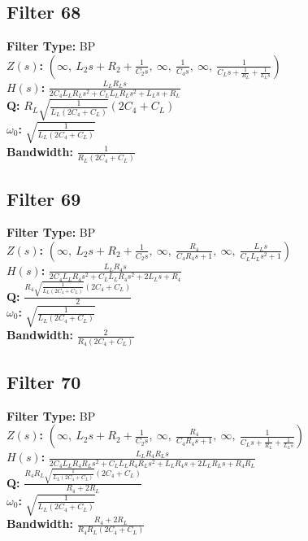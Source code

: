 \documentclass{article}
\begin{document}
\subsection*{Filter 68}
\textbf{Filter Type:} BP \\ 
\textbf{$Z(s)$:} $\left( \infty, \  L_{2} s + R_{2} + \frac{1}{C_{2} s}, \  \infty, \  \frac{1}{C_{4} s}, \  \infty, \  \frac{1}{C_{L} s + \frac{1}{R_{L}} + \frac{1}{L_{L} s}}\right)$ \\ 
\textbf{$H(s)$:} $\frac{L_{L} R_{L} s}{2 C_{4} L_{L} R_{L} s^{2} + C_{L} L_{L} R_{L} s^{2} + L_{L} s + R_{L}}$ \\ 
\textbf{Q:} $R_{L} \sqrt{\frac{1}{L_{L} \left(2 C_{4} + C_{L}\right)}} \left(2 C_{4} + C_{L}\right)$ \\ 
\textbf{$\omega_0$:} $\sqrt{\frac{1}{L_{L} \left(2 C_{4} + C_{L}\right)}}$ \\ 
\textbf{Bandwidth:} $\frac{1}{R_{L} \left(2 C_{4} + C_{L}\right)}$ \\ 
\subsection*{Filter 69}
\textbf{Filter Type:} BP \\ 
\textbf{$Z(s)$:} $\left( \infty, \  L_{2} s + R_{2} + \frac{1}{C_{2} s}, \  \infty, \  \frac{R_{4}}{C_{4} R_{4} s + 1}, \  \infty, \  \frac{L_{L} s}{C_{L} L_{L} s^{2} + 1}\right)$ \\ 
\textbf{$H(s)$:} $\frac{L_{L} R_{4} s}{2 C_{4} L_{L} R_{4} s^{2} + C_{L} L_{L} R_{4} s^{2} + 2 L_{L} s + R_{4}}$ \\ 
\textbf{Q:} $\frac{R_{4} \sqrt{\frac{1}{L_{L} \left(2 C_{4} + C_{L}\right)}} \left(2 C_{4} + C_{L}\right)}{2}$ \\ 
\textbf{$\omega_0$:} $\sqrt{\frac{1}{L_{L} \left(2 C_{4} + C_{L}\right)}}$ \\ 
\textbf{Bandwidth:} $\frac{2}{R_{4} \left(2 C_{4} + C_{L}\right)}$ \\ 
\subsection*{Filter 70}
\textbf{Filter Type:} BP \\ 
\textbf{$Z(s)$:} $\left( \infty, \  L_{2} s + R_{2} + \frac{1}{C_{2} s}, \  \infty, \  \frac{R_{4}}{C_{4} R_{4} s + 1}, \  \infty, \  \frac{1}{C_{L} s + \frac{1}{R_{L}} + \frac{1}{L_{L} s}}\right)$ \\ 
\textbf{$H(s)$:} $\frac{L_{L} R_{4} R_{L} s}{2 C_{4} L_{L} R_{4} R_{L} s^{2} + C_{L} L_{L} R_{4} R_{L} s^{2} + L_{L} R_{4} s + 2 L_{L} R_{L} s + R_{4} R_{L}}$ \\ 
\textbf{Q:} $\frac{R_{4} R_{L} \sqrt{\frac{1}{L_{L} \left(2 C_{4} + C_{L}\right)}} \left(2 C_{4} + C_{L}\right)}{R_{4} + 2 R_{L}}$ \\ 
\textbf{$\omega_0$:} $\sqrt{\frac{1}{L_{L} \left(2 C_{4} + C_{L}\right)}}$ \\ 
\textbf{Bandwidth:} $\frac{R_{4} + 2 R_{L}}{R_{4} R_{L} \left(2 C_{4} + C_{L}\right)}$ \\ 
\end{document}
